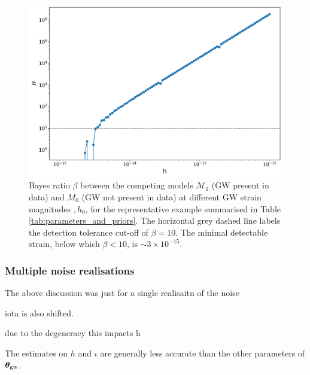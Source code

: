 \documentclass[fleqn,usenatbib,useAMS]{mnras}
\begin{document}
\begin{figure}
	\includegraphics[width=\columnwidth]{images/PaperBayesRatioPlotn1000_stacked}
	\caption{Bayes ratio $\beta$ between the competing models $\mathcal{M_1}$ (GW present in data) and $M_0$ (GW not present in data) at different GW strain magnitudes $,h_0$, for the representative example summarised in Table \ref{tab:parameters_and_priors}. The horizontal grey dashed line labels the detection tolerance cut-off of $\beta = 10$. The minimal detectable strain, below which $\beta < 10$, is $\sim 3 \times 10^{-15}$.}
	\label{fig:bayes}
\end{figure}

\subsubsection{Multiple noise realisations} \label{sec:multiple_noise}

The above discussion was just for a single realisaitn of the noise




iota is also shifted.

due to the degeneracy this impacts h

The estimates on $h$ and $\iota$ are generally less accurate than the other parameters of $\boldsymbol{\theta}_{\rm gw}$. 
\end{document}
